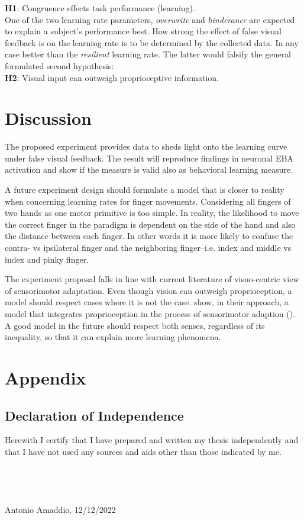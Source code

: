 \documentclass[man]{apa7}
\begin{document}
\textbf{H1}: Congruence effects task performance (learning).\\

One of the two learning rate parameters, \textit{overwrite} and \textit{hinderance} are expected to explain a subject's performance best. How strong the effect of false visual feedback is on the learning rate is to be determined by the collected data. In any case better than the \textit{resilient} learning rate. The latter would falsify the general formulated second hypothesis: \\

\textbf{H2}: Visual input can outweigh proprioceptive information.

\section{Discussion}

The proposed experiment provides data to sheds light onto the learning curve under false visual feedback. The result will reproduce findings in neuronal EBA activation and show if the measure is valid also as behavioral learning measure.

A future experiment design should formulate a model that is closer to reality when concerning learning rates for finger movements. Considering all fingers of two hands as one motor primitive is too simple. In reality, the likelihood to move the correct finger in the paradigm is dependent on the side of the hand and also the distance between each finger. In other words it is more likely to confuse the contra- vs ipsilateral finger and the neighboring finger–i.e. index and middle vs index and pinky finger.

The experiment proposal falls in line with current literature of visuo-centric view of sensorimotor adaptation. Even though vision can outweigh proprioception, a model should respect cases where it is not the case. \citeauthor{Tsay2022} show, in their approach, a model that integrates proprioception in the process of sensorimotor adaption (\citeyear{Tsay2022}). A good model in the future should respect both senses, regardless of its inequality, so that it can explain more learning phenomena.

\printbibliography
\newpage
\section{Appendix}

\subsection{Declaration of Independence}

Herewith I certify that I have prepared and written my thesis independently and that I have not used any sources and aids other than those indicated by me. \\
\mbox{}\\
\mbox{}\\
\mbox{}\\
\mbox{}\\
Antonio Amaddio, 12/12/2022
\end{document}
